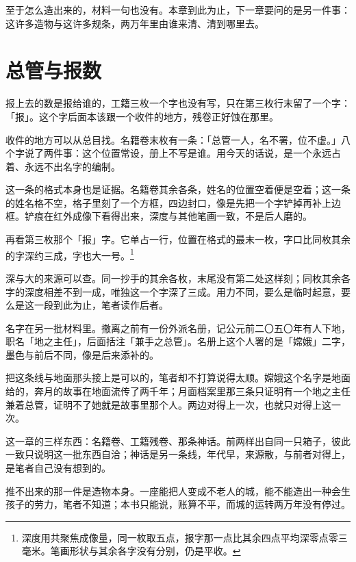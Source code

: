 至于怎么造出来的，材料一句也没有。本章到此为止，下一章要问的是另一件事：这许多造物与这许多规条，两万年里由谁来清、清到哪里去。

\section{总管与报数}

报上去的数是报给谁的，工籍三枚一个字也没有写，只在第三枚行末留了一个字：「报」。这个字后面本该跟一个收件的地方，残卷正好蚀在那里。

收件的地方可以从总目找。名籍卷末枚有一条：「总管一人，名不署，位不虚。」八个字说了两件事：这个位置常设，册上不写是谁。用今天的话说，是一个永远占着、永远不出名字的编制。

这一条的格式本身也是证据。名籍卷其余各条，姓名的位置空着便是空着；这一条的姓名格不空，格子里刻了一个方框，四边封口，像是先把一个字铲掉再补上边框。铲痕在红外成像下看得出来，深度与其他笔画一致，不是后人磨的。

再看第三枚那个「报」字。它单占一行，位置在格式的最末一枚，字口比同枚其余的字深约三成，字也大一号。\footnote{深度用共聚焦成像量，同一枚取五点，报字那一点比其余四点平均深零点零三毫米。笔画形状与其余各字没有分别，仍是平收。}

深与大的来源可以查。同一抄手的其余各枚，末尾没有第二处这样刻；同枚其余各字的深度相差不到一成，唯独这一个字深了三成。用力不同，要么是临时起意，要么是这一段到此为止，笔者读作后者。

名字在另一批材料里。撤离之前有一份外派名册，记公元前二〇五〇年有人下地，职名「地之主任」，后面括注「兼手之总管」。名册上这个人署的是「嫦娥」二字，墨色与前后不同，像是后来添补的。

把这条线与地面那头接上是可以的，笔者却不打算说得太顺。嫦娥这个名字是地面给的，奔月的故事在地面流传了两千年；月面档案里那三条只证明有一个地之主任兼着总管，证明不了她就是故事里那个人。两边对得上一次，也就只对得上这一次。

这一章的三样东西：名籍卷、工籍残卷、那条神话。前两样出自同一只箱子，彼此一致只说明这一批东西自洽；神话是另一条线，年代早，来源散，与前者对得上，是笔者自己没有想到的。

推不出来的那一件是造物本身。一座能把人变成不老人的城，能不能造出一种会生孩子的劳力，笔者不知道；本书只能说，账算不平，而城的运转两万年没有停过。
